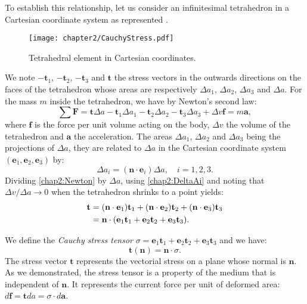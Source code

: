 To establish this relationship, let us consider an infinitesimal tetrahedron in a Cartesian coordinate system as represented . 
%
\begin{figure}[h]
\begin{center}
\texttt{[image: chapter2/CauchyStress.pdf]}
\end{center}
\caption{Tetrahedral element in Cartesian coordinates. }
\label{chap2:fig-CauchyStress}
\end{figure}
%
We note $-\mathbf{t}_1$, $-\mathbf{t}_2$, $-\mathbf{t}_3$ and $\mathbf{t}$ the stress vectors in the outwards directions on the faces of the tetrahedron whose areas are respectively $\Delta a_1$, $\Delta a_2$, $\Delta a_3$ and $\Delta a$. For the mass $m$ inside the tetrahedron, we have by Newton's second law:
\begin{equation}
\label{chap2:Newton}
\sum \mathbf{F} = \mathbf{t} \Delta a - \mathbf{t}_1 \Delta a_1 - \mathbf{t}_2 \Delta a_2 - \mathbf{t}_3 \Delta a_3 + \Delta v \mathbf{f} = m \mathbf{a},
\end{equation}
where $\mathbf{f}$ is the force per unit volume acting on the body, $\Delta v$ the volume of the tetrahedron and $\mathbf{a}$ the acceleration.
The areas $\Delta a_1$, $\Delta a_2$ and $\Delta a_3$ being the projections of $\Delta a$, they are related to $\Delta a$ in the Cartesian coordinate system $(\mathbf{e}_1, \mathbf{e}_2, \mathbf{e}_3)$ by:
\begin{equation}
\label{chap2:DeltaAi}
\Delta a_i = (\mathbf{n} \cdot \mathbf{e}_i) \Delta a, \quad i=1, 2, 3.
\end{equation}
Dividing \eqref{chap2:Newton} by $\Delta a$, using \eqref{chap2:DeltaAi} and noting that $\Delta v \slash \Delta a \rightarrow 0$ when the tetrahedron shrinks to a point yields:
\begin{align}
\mathbf{t} &= (\mathbf{n} \cdot \mathbf{e}_1) \mathbf{t}_1 + (\mathbf{n} \cdot \mathbf{e}_2) \mathbf{t}_2 + (\mathbf{n} \cdot \mathbf{e}_3) \mathbf{t}_3 \notag \\
&= \mathbf{n} \cdot (\mathbf{e}_1 \mathbf{t}_1 + \mathbf{e}_2 \mathbf{t}_2 + \mathbf{e}_3 \mathbf{t}_3).
\end{align}

We define the \emph{Cauchy stress tensor} $\sigma = \mathbf{e}_1 \mathbf{t}_1 + \mathbf{e}_2 \mathbf{t}_2 + \mathbf{e}_3 \mathbf{t}_3$ and we have:
\begin{equation}
\label{chap2:CauchyFormula}
\mathbf{t}(\mathbf{n}) = \mathbf{n} \cdot \sigma .
\end{equation}
The stress vector $\mathbf{t}$ represents the vectorial stress on a plane whose normal is $\mathbf{n}$. As we demonstrated, the stress tensor is a property of the medium that is independent of $\mathbf{n}$. It represents the current force per unit of deformed area: $d\mathbf{f} = \mathbf{t} da = \sigma \cdot d\mathbf{a}$. 

